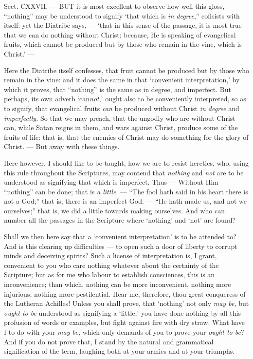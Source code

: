 
Sect. CXXVII. — BUT it is most excellent to observe how well this gloss, “nothing” may be understood to signify ‘that which is \emph{in degree},” cofisists with itself: yet the Diatribe says, — ‘that in this sense of the passage, it is most true that we can do nothing without Christ: because, He is speaking of evangelical fruits, which cannot be produced but by those who remain in the vine, which is Christ.’ —

Here the Diatribe itself confesses, that fruit cannot be produced but by those who remain in the vine: and it does the same in that ‘convenient interpretation,’ by which it proves, that “nothing” is the same as in degree, and imperfect. But perhaps, its own adverb ‘can\emph{not},’ ought also to be conveniently interpreted, so as to signify, that evangelical fruits \emph{can }be produced without Christ \emph{in degree }and \emph{imperfectly. }So that we may preach, that the ungodly who are without Christ can, while Satan reigns in them, and wars against Christ, produce some of the fruits of life: that is, that the enemies of Christ may do something for the glory of Christ. — But away with these things.

Here however, I should like to be taught, how we are to resist heretics, who, using this rule throughout the Scriptures, may contend that \emph{nothing }and \emph{not} are to be understood as signifying that which is imperfect. Thus — Without Him “nothing” can be done; that is \emph{a little}. — “The fool hath said in his heart there is not a God;” that is, there is an imperfect God. — “He hath made us, and not we ourselves;” that is, we did a little towards making ourselves. And who can number all the passages in the Scripture where ‘nothing’ and ‘not’ are found?

Shall we then here say that a ‘convenient interpretation’ is to be attended to? And is this clearing up difficulties — to open such a door of liberty to corrupt minds and deceiving spirits? Such a license of interpretation is, I grant, convenient to you who care nothing whatever about the certainty of the Scripture; but as for me who labour to establish consciences, this is an inconvenience; than which, nothing can be more inconvenient, nothing more injurious, nothing more pestilential. Hear me, therefore, thou great conqueress of the Lutheran Achilles! Unless you shall prove, that ‘nothing’ not only\emph{ may be, }but \emph{ought to be }understood as signifying a ‘little,’ you have done nothing by all this profusion of words or examples, but fight against fire with dry straw. What have I to do with your \emph{may be, }which only demands of you to prove your \emph{ought to be}? And if you do not prove that, I stand by the natural and grammatical signification of the term, laughing both at your armies and at your triumphs.

